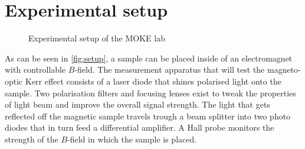 
\section{Experimental setup}
\label{sec:setup}


\begin{figure}
	\label{fig:setup}
	\caption{}{Experimental setup of the MOKE lab}
\end{figure}

As can be seen in \autoref{fig:setup}, a sample can be placed inside of an
electromagnet with controllable $B$-field. The measurement apparatus that will test
the magneto-optic Kerr effect consists of a laser diode that shines polarised light 
onto the sample. Two polarisation filters and focusing lenses exist to tweak the 
properties of light beam and improve the overall signal strength. The light that gets
reflected off the magnetic sample travels trough a beam splitter into two photo 
diodes that in turn feed a differential amplifier. A Hall probe monitors the strength
of the $B$-field in which the sample is placed.
